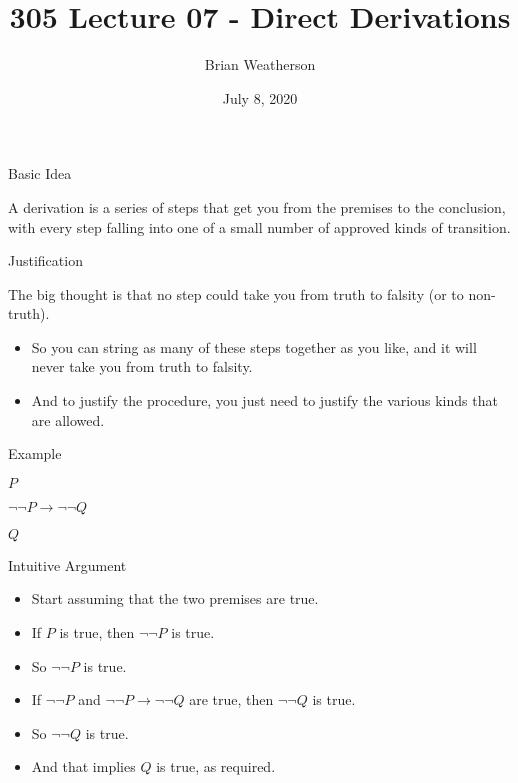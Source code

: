 \documentclass[
  ignorenonframetext,
]{beamer}
\title{305 Lecture 07 - Direct Derivations}
\author{Brian Weatherson}
\date{July 8, 2020}
\providecommand{\tightlist}{%
  \setlength{\itemsep}{0pt}\setlength{\parskip}{0pt}}
\renewcommand{\,}{\text{, }}
\renewenvironment*{quote}	
	{\list{}{\rightmargin   \leftmargin} \item } 	
	{\endlist }
\newcommand{\DisplayArg}[2]{
\begin{enumerate}
{#1}
\end{enumerate}
\vspace{-6pt}
\hrulefill

\begin{quote}
{\normalfont #2}
\end{quote}
\vspace{12pt}
}
\begin{document}
\frame{\titlepage}

\begin{frame}{Basic Idea}
\protect\hypertarget{basic-idea}{}

A derivation is a series of steps that get you from the premises to the
conclusion, with every step falling into one of a small number of
approved kinds of transition.

\end{frame}

\begin{frame}{Justification}
\protect\hypertarget{justification}{}

The big thought is that no step could take you from truth to falsity (or
to non-truth).

\begin{itemize}
\tightlist
\item
  So you can string as many of these steps together as you like, and it
  will never take you from truth to falsity.
\item
  And to justify the procedure, you just need to justify the various
  kinds that are allowed.
\end{itemize}

\end{frame}

\begin{frame}{Example}
\protect\hypertarget{example}{}

\DisplayArg{ \item $P$ \item $\neg \neg P \rightarrow \neg \neg Q$ } { $Q$ }

\end{frame}

\begin{frame}{Intuitive Argument}
\protect\hypertarget{intuitive-argument}{}

\begin{itemize}[<+->]
\tightlist
\item
  Start assuming that the two premises are true.
\item
  If \(P\) is true, then \(\neg \neg P\) is true.
\item
  So \(\neg \neg P\) is true.
\item
  If \(\neg \neg P\) and \(\neg \neg P \rightarrow \neg \neg Q\) are
  true, then \(\neg \neg Q\) is true.
\item
  So \(\neg \neg Q\) is true.
\item
  And that implies \(Q\) is true, as required.
\end{itemize}

\end{frame}
\end{document}
